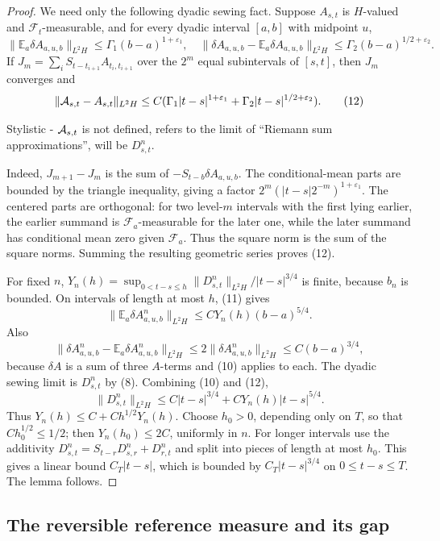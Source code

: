 \documentclass[12pt]{article}
\newcommand{\E}{\mathbb E}
\newcommand{\1}{\mathbf 1}
\newcommand{\calF}{\mathcal F}
\newcommand{\review}[1]{\begin{reviewbox}#1\end{reviewbox}}
\begin{document}
\begin{proof}
We need only the following dyadic sewing fact.  Suppose \(A_{s,t}\) is
\(H\)-valued and \(\calF_t\)-measurable, and for every dyadic interval
\([a,b]\) with midpoint \(u\),
\[
\|\E_a\delta A_{a,u,b}\|_{L^2H}\le \Gamma_1(b-a)^{1+\varepsilon_1},\quad
\|\delta A_{a,u,b}-\E_a\delta A_{a,u,b}\|_{L^2H}
        \le \Gamma_2(b-a)^{1/2+\varepsilon_2}.
\]
If \(J_m=\sum_iS_{t-t_{i+1}}A_{t_i,t_{i+1}}\) over the \(2^m\) equal
subintervals of \([s,t]\), then \(J_m\) converges and
\[
 \|{\cal A}_{s,t}-A_{s,t}\|_{L^2H}
 \le C(\Gamma_1|t-s|^{1+\varepsilon_1}
       +\Gamma_2|t-s|^{1/2+\varepsilon_2}).                 \tag{12}
\]
\review{ Stylistic - ${\cal A}_{s,t}$ is not defined, refers to the limit of ``Riemann sum approximations'', will be $D^{n}_{s,t}$. }
Indeed, \(J_{m+1}-J_m\) is the sum of
\(-S_{t-b}\delta A_{a,u,b}\).  The conditional-mean parts are bounded by the
triangle inequality, giving a factor
\(2^m(|t-s|2^{-m})^{1+\varepsilon_1}\).  The centered parts are orthogonal:
for two level-\(m\) intervals with the first lying earlier, the earlier
summand is \(\calF_a\)-measurable for the later one, while the later summand
has conditional mean zero given \(\calF_a\).  Thus the square norm is the sum
of the square norms.  Summing the resulting geometric series proves (12).

For fixed \(n\), \(Y_n(h)=\sup_{0<t-s\le h}\|D^n_{s,t}\|_{L^2H}/|t-s|^{3/4}\)
is finite, because \(b_n\) is bounded.  On intervals of length at most \(h\),
(11) gives
\[
 \|\E_a\delta A^n_{a,u,b}\|_{L^2H}\le C Y_n(h)(b-a)^{5/4}.
\]
Also
\[
\|\delta A^n_{a,u,b}-\E_a\delta A^n_{a,u,b}\|_{L^2H}
 \le 2\|\delta A^n_{a,u,b}\|_{L^2H}
 \le C(b-a)^{3/4},
\]
because \(\delta A\) is a sum of three \(A\)-terms and (10) applies to each.
The dyadic sewing limit is \(D^n_{s,t}\) by (8).  Combining (10) and (12),
\[
 \|D^n_{s,t}\|_{L^2H}\le C|t-s|^{3/4}
        +C Y_n(h)|t-s|^{5/4}.
\]
Thus \(Y_n(h)\le C+Ch^{1/2}Y_n(h)\).  Choose \(h_0>0\), depending only on
\(T\), so that \(Ch_0^{1/2}\le1/2\); then \(Y_n(h_0)\le2C\), uniformly in
\(n\).  For longer intervals use the additivity
\(D^n_{s,t}=S_{t-r}D^n_{s,r}+D^n_{r,t}\) and split into pieces of length at
most \(h_0\).  This gives a linear bound \(C_T|t-s|\), which is bounded by
\(C_T|t-s|^{3/4}\) on \(0\le t-s\le T\).  The lemma follows.
\end{proof}

\subsection*{The reversible reference measure and its gap}
\end{document}
